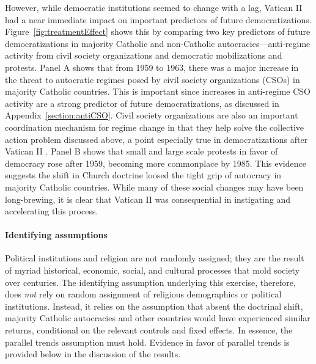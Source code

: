 However, while democratic institutions seemed to change with a lag, Vatican II had a near immediate impact on important predictors of future democratizations. Figure~\ref{fig:treatmentEffect} shows this by comparing two key predictors of future democratizations in majority Catholic and non-Catholic autocracies---anti-regime activity from civil society organizations and democratic mobilizations and protests. Panel A shows that from 1959 to 1963, there was a major increase in the threat to autocratic regimes posed by civil society organizations (CSOs) in majority Catholic countries.  This is important since increases in anti-regime CSO activity are a strong predictor of future democratizations, as discussed in Appendix~\ref{section:antiCSO}. Civil society organizations are also an important coordination mechanism for regime change in that they help solve the collective action problem discussed above, a point especially true in democratizations after Vatican II \citep{Arato1981a,Arato1981b,Stepan1985,Stepan1988,Linz1996}. Panel B shows that small and large scale protests in favor of democracy rose after 1959,  becoming more commonplace by 1985. This evidence suggests the shift in Church doctrine loosed the tight grip of autocracy in majority Catholic countries. While many of these social changes may have been long-brewing, it is clear that Vatican II was consequential in instigating and accelerating this process.
\label{par:pol_cond_eff_end}



\paragraph{Identifying assumptions}

Political institutions and religion are not randomly assigned; they are the result of myriad historical, economic, social, and cultural processes that mold society over centuries. The identifying assumption underlying this exercise, therefore, does \textit{not} rely on random assignment of religious demographics or political institutions. Instead, it relies on the assumption that absent the doctrinal shift, majority Catholic autocracies and other countries would have experienced similar returns, conditional on the relevant controls and fixed effects. In essence, the parallel trends assumption must hold. Evidence in favor of parallel trends is provided below in the discussion of the results.



